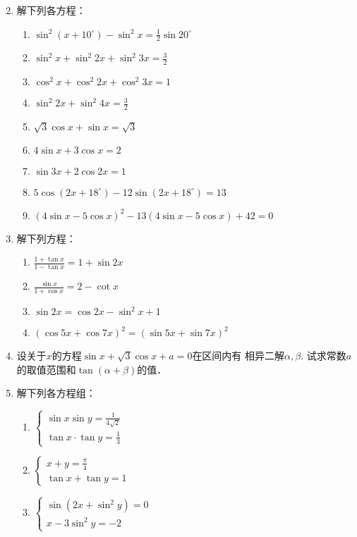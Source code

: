 \begin{enumerate}
\begin{multicols}{2}
\begin{enumerate}
\end{enumerate}
\end{multicols}

\item 解下列各方程：
    \begin{enumerate}
\item $\sin ^{2}\left(x+10^{\circ}\right)-\sin ^{2} x=\frac{1}{2} \sin 20^{\circ}$
\item $\sin ^{2} x+\sin ^{2} 2 x+\sin ^{2} 3 x=\frac{3}{2}$
\item $\cos ^{2} x+\cos ^{2} 2 x+\cos ^{2} 3 x=1$
\item $\sin ^{2} 2 x+\sin ^{2} 4 x=\frac{3}{2}$
\item $\sqrt{3} \cos x+\sin x=\sqrt{3} $
\item $4 \sin x+3 \cos x=2 $
\item $\sin 3 x+2 \cos 2 x=1 $
\item  $5 \cos \left(2 x+18^{\circ}\right)-12 \sin \left(2 x+18^{\circ}\right)=13$
\item $(4 \sin x-5 \cos x)^{2}-13(4 \sin x-5 \cos x)+42=0$
\end{enumerate}


\item 解下列方程：
    \begin{enumerate}
\item $\frac{1+\tan x}{1-\tan x}=1+\sin 2 x$
\item $\frac{\sin x}{1+\cos x}=2-\cot x$
\item $\sin 2 x=\cos 2 x-\sin ^{2} x+1$
\item $(\cos 5 x+\cos 7 x)^{2}=(\sin 5 x+\sin 7 x)^{2}$
\end{enumerate}

\item 设关于$x$的方程$\sin x+\sqrt{3}\cos x+a=0$在区间内有
相异二解$\alpha,\beta$. 试求常数$a$的取值范围和$\tan(\alpha+\beta)$的值．
\item 解下列各方程组：
\begin{multicols}{2}
    \begin{enumerate}
\item $\begin{cases}
    \sin x\sin y=\frac{1}{4\sqrt{2}}\\
    \tan x\cdot \tan y=\frac{1}{3}
\end{cases}$
\item $\begin{cases}
    x+y=\frac{\pi}{4}\\
    \tan x+\tan y=1
\end{cases}$
\item $\begin{cases}
    \sin(2x+\sin^2y)=0\\
    x-3\sin^2y=-2
\end{cases}$
\end{enumerate}
\end{multicols}


\end{enumerate}
